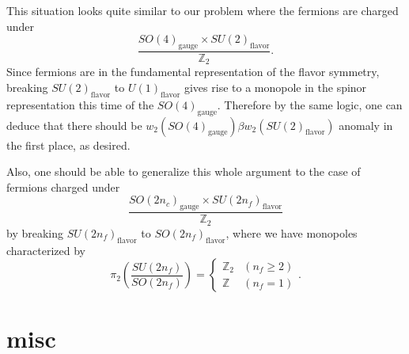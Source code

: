 \documentclass[12pt]{article}
\numberwithin{equation}{section}
\def\bZ{\mathbb{Z}}
\begin{document}
This situation looks quite similar to our problem where the fermions are charged under
\begin{equation*}
	\dfrac{SO(4)_{\text{gauge}} \times SU(2)_{\text{flavor}}}{\bZ_2}.
\end{equation*}
Since fermions are in the fundamental representation of the flavor symmetry,
breaking $SU(2)_{\text{flavor}}$ to $U(1)_{\text{flavor}}$ gives rise to
a monopole in the spinor representation this time of the $SO(4)_{\text{gauge}}$\cite{Harvey:1996ur}.
Therefore by the same logic, one can deduce that there should be
$w_2(SO(4)_{\text{gauge}})\beta w_2(SU(2)_{\text{flavor}})$ anomaly in the first place, as desired.

Also, one should be able to generalize this whole argument to the case of fermions charged under
\begin{equation*}
	\dfrac{SO(2n_c)_{\text{gauge}} \times SU(2n_f)_{\text{flavor}}}{\bZ_2}
\end{equation*}
by breaking $SU(2n_f)_{\text{flavor}}$ to $SO(2n_f)_{\text{flavor}}$,
where we have monopoles characterized by
\begin{equation*}
	\pi_2\left(
		\dfrac{SU(2n_f)}{SO(2n_f)}
	\right)
	=
	\left\{
		\begin{array}{cl}
			\bZ_2 & (n_f \geq 2)\\
			\bZ & (n_f = 1)
		\end{array}
	\right..
\end{equation*}

\newpage

\section{misc}
\end{document}
